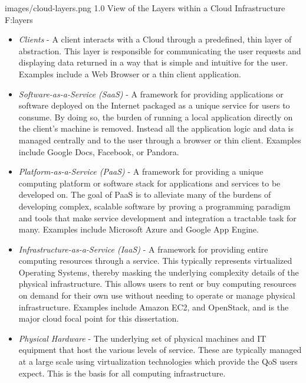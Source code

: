  {images/cloud-layers.png}
 {1.0}
 {View of the Layers within a Cloud Infrastructure}
 {F:layers}


\begin{itemize}
\item{\em Clients} - A client interacts with a Cloud through a predefined, thin layer of abstraction.  This layer is responsible for communicating the user requests and displaying data returned in a way that is simple and intuitive for the user. Examples include a Web Browser or a thin client application.

\item{\em Software-as-a-Service (SaaS)} - A framework for providing applications or software deployed on the Internet packaged as a unique service for users to consume.  By doing so, the burden of running a local application directly on the client's machine is removed.  Instead all the application logic and data is managed centrally and to the user through a browser or thin client.  Examples include Google Docs, Facebook, or Pandora.

\item{\em Platform-as-a-Service (PaaS)} - A framework for providing a unique computing platform or software stack for applications and services to be developed on.  The goal of PaaS is to alleviate many of the burdens of developing complex, scalable software by proving a programming paradigm and tools that make service development and integration a tractable task for many.  Examples include Microsoft Azure and Google App Engine.

\item{\em Infrastructure-as-a-Service (IaaS)} - A framework for providing entire computing resources through a service.  This typically represents virtualized Operating Systems, thereby masking the underlying complexity details of the physical infrastructure.  This allows users to rent or buy computing resources on demand for their own use without needing to operate or manage physical infrastructure.  Examples include Amazon EC2, and OpenStack, and is the major cloud focal point for this dissertation.
  
\item{\em Physical Hardware} - The underlying set of physical machines and IT equipment that host the various levels of service.  These are typically managed at a large scale using virtualization technologies which provide the QoS users expect.  This is the basis for all computing infrastructure.
\end{itemize}

